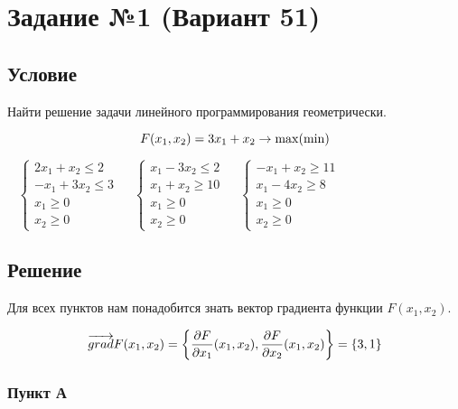 \section{Задание №1 (Вариант 51)}\label{01-lab}

\subsection{Условие}\label{01-lab-condition}

Найти решение задачи линейного программирования геометрически.

\[
    F(x_1, x_2) = 3x_1 + x_2 \to \max(\min)\\
\]

{\huge{\ }}
$
    \begin{cases}
        2x_1 + x_2 \leq 2  \\
        -x_1 + 3x_2 \leq 3 \\
        x_1 \geq 0         \\
        x_2 \geq 0
    \end{cases}
$
\hspace{1.5cm}
{\huge{\ }}
$
    \begin{cases}
        x_1 - 3x_2 \leq 2 \\
        x_1 + x_2 \geq 10 \\
        x_1 \geq 0        \\
        x_2 \geq 0
    \end{cases}
$
\hspace{1.5cm}
{\huge{\ }}
$
    \begin{cases}
        -x_1 + x_2 \geq 11 \\
        x_1 - 4x_2 \geq 8  \\
        x_1 \geq 0         \\
        x_2 \geq 0
    \end{cases}
$

\subsection{Решение}\label{01-lab-solution}

Для всех пунктов нам понадобится знать вектор градиента функции $F(x_1, x_2)$.

\[\overrightarrow{grad}F(x_1, x_2) = \left\{\frac{\partial F}{\partial x_1}(x_1, x_2), \frac{\partial F}{\partial x_2}(x_1, x_2)\right\} = \left\{3, 1\right\}\]

\subsubsection{Пункт А}\label{01-lab-a}

